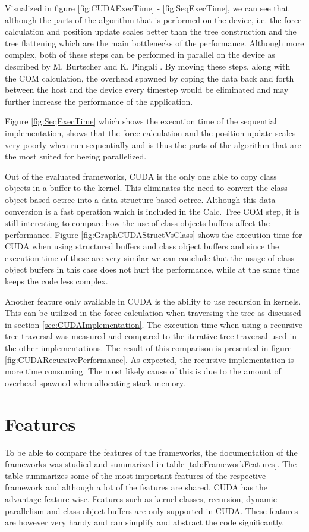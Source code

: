 Visualized in figure \ref{fig:CUDAExecTime} - \ref{fig:SeqExecTime}, we can see that although the parts of the algorithm that is performed on the device, i.e. the force calculation and position update scales better than the tree construction and the tree flattening which are the main bottlenecks of the performance. Although more complex, both of these steps can be performed in parallel on the device as described by M. Burtscher and K. Pingali \cite{burtscher2011efficient}. By moving these steps, along with the COM calculation, the overhead spawned by coping the data back and forth between the host and the device every timestep would be eliminated and may further increase the performance of the application. 

Figure \ref{fig:SeqExecTime} which shows the execution time of the sequential implementation, shows that the force calculation and the position update scales very poorly when run sequentially and is thus the parts of the algorithm that are the most suited for beeing parallelized. 

Out of the evaluated frameworks, CUDA is the only one able to copy class objects in a buffer to the kernel. This eliminates the need to convert the class object based octree into a data structure based octree. Although this data conversion is a fast operation which is included in the Calc. Tree COM step, it is still interesting to compare how the use of class objects buffers affect the performance. Figure \ref{fig:GraphCUDAStructVsClass} shows the execution time for CUDA when using structured buffers and class object buffers and since the execution time of these are very similar we can conclude that the usage of class object buffers in this case does not hurt the performance, while at the same time keeps the code less complex. 


Another feature only available in CUDA is the ability to use recursion in kernels. This can be utilized in the force calculation when traversing the tree as discussed in section \ref{sec:CUDAImplementation}. The execution time when using a recursive tree traversal was measured and compared to the iterative tree traversal used in the other implementations. The result of this comparison is presented in figure \ref{fig:CUDARecursivePerformance}. As expected, the recursive implementation is more time consuming. The most likely cause of this is due to the amount of overhead spawned when allocating stack memory.




\section{Features} \label{sec:DiscussionFeatures}
To be able to compare the features of the frameworks, the documentation of the frameworks was studied and summarized in table \ref{tab:FrameworkFeatures}. The table summarizes some of the most important features of the respective framework and although a lot of the features are shared, CUDA has the advantage feature wise. Features such as kernel classes, recursion, dynamic parallelism and class object buffers are only supported in CUDA. These features are however very handy and can simplify and abstract the code significantly.

